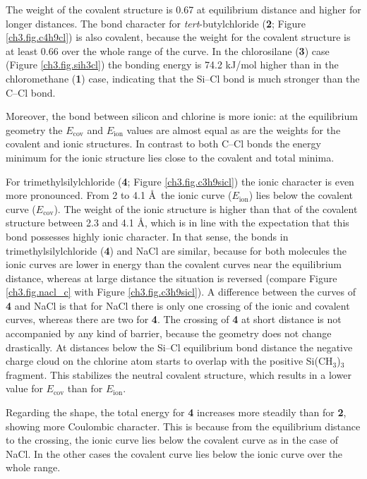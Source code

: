 The weight of the covalent structure is 0.67 at equilibrium distance and higher for longer distances. The bond character for \textit{tert}-butylchloride (\textbf{2}; Figure \ref{ch3.fig.c4h9cl}) is also covalent, because the weight for the covalent structure is at least 0.66 over the whole range of the curve.
In the chlorosilane (\textbf{3}) case (Figure \ref{ch3.fig.sih3cl}) the bonding energy is 74.2 kJ/mol higher than in the chloromethane (\textbf{1}) case, indicating that the Si--Cl bond is much stronger than the C--Cl bond. 

Moreover, the bond between silicon and chlorine is more ionic: at the equilibrium geometry the $E_\mathrm{cov}$ and $E_\mathrm{ion}$ values are almost equal as are the weights for the covalent and ionic structures. In contrast to both C--Cl bonds the energy minimum for the ionic structure lies close to the covalent and total minima.  

For trimethylsilylchloride (\textbf{4}; Figure \ref{ch3.fig.c3h9sicl}) the ionic character is even more pronounced. From 2 to 4.1 \AA\  the ionic curve ($E_\mathrm{ion}$) lies below the covalent curve ($E_\mathrm{cov}$). The weight of the ionic structure is higher than that of the covalent structure between 2.3 and 4.1 \AA, which is in line with the expectation that this bond possesses highly ionic character. In that sense, the bonds in trimethylsilylchloride (\textbf{4}) and NaCl are similar, because for both molecules the ionic curves are lower in energy than the covalent curves near the equilibrium distance, whereas at large distance the situation is reversed (compare Figure \ref{ch3.fig.nacl_c} with Figure \ref{ch3.fig.c3h9sicl}). A difference between the curves of \textbf{4} and NaCl is that for NaCl there is only one crossing of the ionic and covalent curves, whereas there are two for \textbf{4}. The crossing of \textbf{4} at short distance is not accompanied by any kind of barrier, because the geometry does not change drastically. At distances below the Si--Cl equilibrium bond distance the negative charge cloud on the chlorine atom starts to overlap with the positive Si(CH$_3$)$_3$ fragment. This stabilizes the neutral covalent structure, which results in a lower value for $E_\mathrm{cov}$ than for $E_\mathrm{ion}$. 

Regarding the shape, the total energy for \textbf{4} increases more steadily than for \textbf{2}, showing more Coulombic character. This is because from the equilibrium distance to the crossing, the ionic curve lies below the covalent curve as in the case of NaCl. In the other cases the covalent curve lies below the ionic curve over the whole range.

